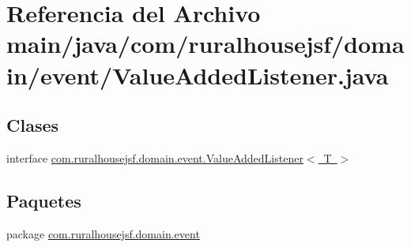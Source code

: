 \hypertarget{a00035}{}\section{Referencia del Archivo main/java/com/ruralhousejsf/domain/event/\+Value\+Added\+Listener.java}
\label{a00035}
\subsection*{Clases}
\begin{DoxyCompactItemize}
\item 
interface \mbox{\hyperlink{a00172}{com.\+ruralhousejsf.\+domain.\+event.\+Value\+Added\+Listener$<$ T $>$}}
\end{DoxyCompactItemize}
\subsection*{Paquetes}
\begin{DoxyCompactItemize}
\item 
package \mbox{\hyperlink{a00115}{com.\+ruralhousejsf.\+domain.\+event}}
\end{DoxyCompactItemize}
